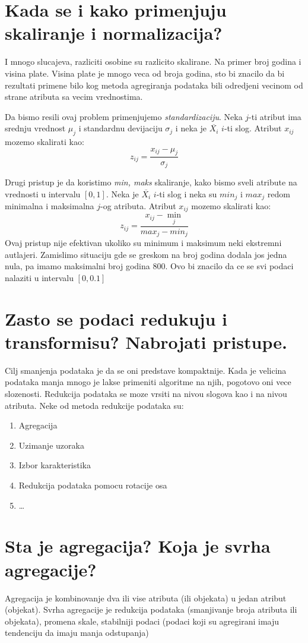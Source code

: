 \documentclass[a4paper]{article}
\begin{document}
\section{Kada se i kako primenjuju skaliranje i normalizacija?}
I mnogo slucajeva, razliciti osobine su razlicito skalirane. Na primer broj godina i visina plate.
Visina plate je mnogo veca od broja godina, sto bi znacilo da bi rezultati primene bilo kog metoda
agregiranja podataka bili odredjeni vecinom od strane atributa sa vecim vrednostima.

Da bismo resili ovaj problem primenjujemo \emph{standardizaciju}. Neka \(j\)-ti atribut ima srednju
vrednost \(\mu_j\) i standardnu devijaciju \(\sigma_j\) i neka je \(\overline{X_i}\) \(i\)-ti slog.
Atribut \(x_{ij}\) mozemo skalirati kao:
\[
    z_{ij} = \dfrac{x_{ij} - \mu_j}{\sigma_j}
\]

Drugi pristup je da koristimo \emph{min, maks} skaliranje, kako bismo sveli atribute na vrednosti u
intervalu \([0, 1]\). Neka je \(\overline{X_i}\) \(i\)-ti slog i neka su \(min_j\) i \(max_j\) redom
minimalna i maksimalna \(j\)-og atributa. Atribut \(x_{ij}\) mozemo skalirati kao:
\[
    z_{ij} = \dfrac{x_{ij} - \min_j}{max_j - min_j}
\]
Ovaj pristup nije efektivan ukoliko su minimum i maksimum neki ekstremni autlajeri. Zamislimo
situaciju gde se greskom na broj godina dodala jos jedna nula, pa imamo maksimalni broj godina 800.
Ovo bi znacilo da ce se svi podaci nalaziti u intervalu \([0, 0.1]\)


\section{Zasto se podaci redukuju i transformisu? Nabrojati pristupe.}
Cilj smanjenja podataka je da se oni predstave kompaktnije. Kada je velicina podataka manja mnogo je
lakse primeniti algoritme na njih, pogotovo oni vece slozenosti. Redukcija podataka se moze vrsiti
na nivou slogova kao i na nivou atributa. Neke od metoda redukcije podataka su:
\begin{enumerate}
    \item Agregacija
    \item Uzimanje uzoraka
    \item Izbor karakteristika
    \item Redukcija podataka pomocu rotacije osa
    \item \ldots
\end{enumerate}

\section{Sta je agregacija? Koja je svrha agregacije?}
Agregacija je kombinovanje dva ili vise atributa (ili objekata) u jedan atribut (objekat). Svrha
agregacije je redukcija podataka (smanjivanje broja atributa ili objekata), promena skale,
stabilniji podaci (podaci koji su agregirani imaju tendenciju da imaju manja odstupanja)
\end{document}
